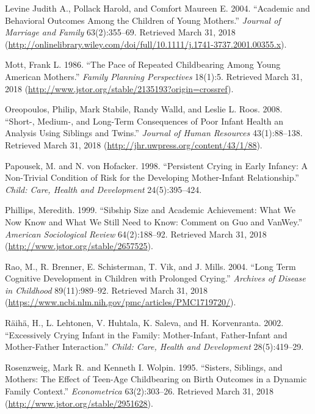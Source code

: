 \documentclass[]{article}
\begin{document}
\hypertarget{ref-levine_judith_a._academic_2004}{}
Levine Judith A., Pollack Harold, and Comfort Maureen E. 2004.
``Academic and Behavioral Outcomes Among the Children of Young
Mothers.'' \emph{Journal of Marriage and Family} 63(2):355--69.
Retrieved March 31, 2018
(\url{http://onlinelibrary.wiley.com/doi/full/10.1111/j.1741-3737.2001.00355.x}).

\hypertarget{ref-mott_pace_1986}{}
Mott, Frank L. 1986. ``The Pace of Repeated Childbearing Among Young
American Mothers.'' \emph{Family Planning Perspectives} 18(1):5.
Retrieved March 31, 2018
(\url{http://www.jstor.org/stable/2135193?origin=crossref}).

\hypertarget{ref-oreopoulos_short-_2008}{}
Oreopoulos, Philip, Mark Stabile, Randy Walld, and Leslie L. Roos. 2008.
``Short-, Medium-, and Long-Term Consequences of Poor Infant Health an
Analysis Using Siblings and Twins.'' \emph{Journal of Human Resources}
43(1):88--138. Retrieved March 31, 2018
(\url{http://jhr.uwpress.org/content/43/1/88}).

\hypertarget{ref-papousek_persistent_1998}{}
Papousek, M. and N. von Hofacker. 1998. ``Persistent Crying in Early
Infancy: A Non-Trivial Condition of Risk for the Developing
Mother-Infant Relationship.'' \emph{Child: Care, Health and Development}
24(5):395--424.

\hypertarget{ref-phillips_sibship_1999}{}
Phillips, Meredith. 1999. ``Sibship Size and Academic Achievement: What
We Now Know and What We Still Need to Know: Comment on Guo and VanWey.''
\emph{American Sociological Review} 64(2):188--92. Retrieved March 31,
2018 (\url{http://www.jstor.org/stable/2657525}).

\hypertarget{ref-rao_long_2004}{}
Rao, M., R. Brenner, E. Schisterman, T. Vik, and J. Mills. 2004. ``Long
Term Cognitive Development in Children with Prolonged Crying.''
\emph{Archives of Disease in Childhood} 89(11):989--92. Retrieved March
31, 2018 (\url{https://www.ncbi.nlm.nih.gov/pmc/articles/PMC1719720/}).

\hypertarget{ref-raiha_excessively_2002}{}
Räihä, H., L. Lehtonen, V. Huhtala, K. Saleva, and H. Korvenranta. 2002.
``Excessively Crying Infant in the Family: Mother-Infant, Father-Infant
and Mother-Father Interaction.'' \emph{Child: Care, Health and
Development} 28(5):419--29.

\hypertarget{ref-rosenzweig_sisters_1995}{}
Rosenzweig, Mark R. and Kenneth I. Wolpin. 1995. ``Sisters, Siblings,
and Mothers: The Effect of Teen-Age Childbearing on Birth Outcomes in a
Dynamic Family Context.'' \emph{Econometrica} 63(2):303--26. Retrieved
March 31, 2018 (\url{http://www.jstor.org/stable/2951628}).
\end{document}
